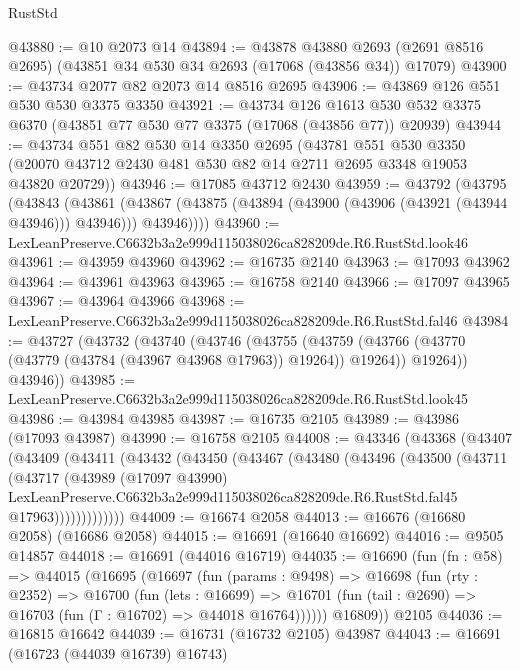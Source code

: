 \begin{lexlean}{RustStd}
\begin{coremodule}
@43880 := @10 @2073 @14
@43894 := @43878
    @43880
    @2693
    (@2691 @8516 @2695)
    (@43851 @34 @530 @34 @2693 (@17068 (@43856 @34)) @17079)
@43900 := @43734 @2077 @82 @2073 @14 @8516 @2695
@43906 := @43869 @126 @551 @530 @530 @3375 @3350
@43921 := @43734
    @126
    @1613
    @530
    @532
    @3375
    @6370
    (@43851 @77 @530 @77 @3375 (@17068 (@43856 @77)) @20939)
@43944 := @43734
    @551
    @82
    @530
    @14
    @3350
    @2695
    (@43781
      @551
      @530
      @3350
      (@20070 @43712 @2430 @481 @530 @82 @14 @2711 @2695 @3348 @19053 @43820 @20729))
@43946 := @17085 @43712 @2430
@43959 := @43792
    (@43795
      (@43843
        (@43861
          (@43867 (@43875 (@43894 (@43900 (@43906 (@43921 (@43944 @43946))) @43946))) @43946))))
@43960 := LexLeanPreserve.C6632b3a2e999d115038026ca828209de.R6.RustStd.look46
@43961 := @43959 @43960
@43962 := @16735 @2140
@43963 := @17093 @43962
@43964 := @43961 @43963
@43965 := @16758 @2140
@43966 := @17097 @43965
@43967 := @43964 @43966
@43968 := LexLeanPreserve.C6632b3a2e999d115038026ca828209de.R6.RustStd.fal46
@43984 := @43727
    (@43732
      (@43740
        (@43746
          (@43755
            (@43759 (@43766 (@43770 (@43779 (@43784 (@43967 @43968 @17963)) @19264)) @19264))
            @19264))
        @43946))
@43985 := LexLeanPreserve.C6632b3a2e999d115038026ca828209de.R6.RustStd.look45
@43986 := @43984 @43985
@43987 := @16735 @2105
@43989 := @43986 (@17093 @43987)
@43990 := @16758 @2105
@44008 := @43346
    (@43368
      (@43407
        (@43409
          (@43411
            (@43432
              (@43450
                (@43467
                  (@43480
                    (@43496
                      (@43500
                        (@43711
                          (@43717
                            (@43989
                              (@17097 @43990)
                              LexLeanPreserve.C6632b3a2e999d115038026ca828209de.R6.RustStd.fal45
                              @17963)))))))))))))
@44009 := @16674 @2058
@44013 := @16676 (@16680 @2058) (@16686 @2058)
@44015 := @16691 (@16640 @16692)
@44016 := @9505 @14857
@44018 := @16691 (@44016 @16719)
@44035 := @16690
    (fun (fn : @58) =>
    @44015
      (@16695
        (@16697
          (fun (params : @9498) =>
          @16698
            (fun (rty : @2352) =>
            @16700
              (fun (lets : @16699) =>
              @16701 (fun (tail : @2690) => @16703 (fun (Γ : @16702) => @44018 @16764))))))
        @16809))
    @2105
@44036 := @16815 @16642
@44039 := @16731 (@16732 @2105) @43987
@44043 := @16691 (@16723 (@44039 @16739) @16743)

\end{coremodule}
\end{lexlean}
